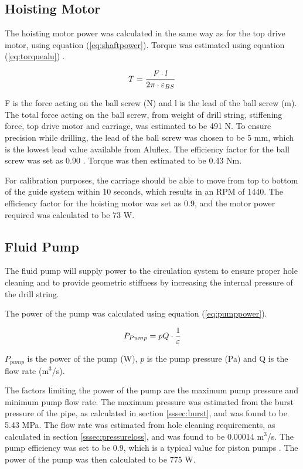 \subsection{Hoisting Motor}
The hoisting motor power was calculated in the same way as for the top drive motor, using equation (\ref{eq:shaftpower}). Torque was estimated using equation (\ref{eq:torquealu}) \cite{aluflex}.

\begin{equation}
\centering
   T =\frac{F \cdot l}{2\pi \cdot \varepsilon_{BS}}
\label{eq:torquealu}
\end{equation}

F is the force acting on the ball screw (N) and l is the lead of the ball screw (m). The total force acting on the ball screw, from weight of drill string, stiffening force, top drive motor and carriage, was estimated to be 491 N. To ensure precision while drilling, the lead of the ball screw was chosen to be 5 mm, which is the lowest lead value available from Aluflex. The efficiency factor for the ball screw was set as 0.90 \cite{aluflex}. Torque was then estimated to be 0.43 Nm.  

For calibration purposes, the carriage should be able to move from top to bottom of the guide system within 10 seconds, which results in an RPM of 1440. The efficiency factor for the hoisting motor was set as 0.9, and the motor power required was calculated to be 73 W.  

\subsection{Fluid Pump}
The fluid pump will supply power to the circulation system to ensure proper hole cleaning and to provide geometric stiffness by increasing the internal pressure of the drill string.

The power of the pump was calculated using equation (\ref{eq:pumppower}).

\begin{equation}
\centering
   P_{Pump}=pQ \cdot \frac{1}{\varepsilon}
\label{eq:pumppower}
\end{equation}

$P_{pump}$ is the power of the pump (W), $p$ is the pump pressure (Pa) and Q is the flow rate (m$^3$/s).

The factors limiting the power of the pump are the maximum pump pressure and minimum pump flow rate. The maximum pressure was estimated from the burst pressure of the pipe, as calculated in section \ref{sssec:burst}, and was found to be 5.43 MPa. The flow rate was estimated from hole cleaning requirements, as calculated in section \ref{sssec:pressureloss}, and was found to be 0.00014 m$^3$/s. The pump efficiency was set to be 0.9, which is a typical value for piston pumps \cite{pumps}. The power of the pump was then calculated to be 775 W.

